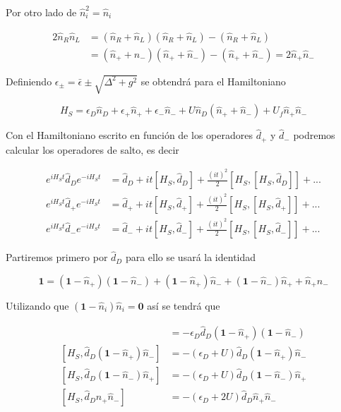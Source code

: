 \begin{appendixs}
Por otro lado de $\hat{n}^{2}_{i} = \hat{n}_{i}$

\begin{align*}
    2 \hat{n}_{R}\hat{n}_{L} & = (\hat{n}_{R} +\hat{n}_{L})(\hat{n}_{R} +\hat{n}_{L}) - (\hat{n}_{R} + \hat{n}_{L}) \\
    & = (\hat{n}_{+} +\hat{n}_{-})(\hat{n}_{+} +\hat{n}_{-}) - (\hat{n}_{+} + \hat{n}_{-})  = 2\hat{n}_{+}\hat{n}_{-}
\end{align*}

Definiendo $\epsilon_{\pm} = \bar{\epsilon} \pm \sqrt{\Delta^{2}+g^{2}}$ se obtendrá para el Hamiltoniano

\begin{equation}
    H_{S} = \epsilon_{D}\hat{n}_{D} + \epsilon_{+}\hat{n}_{+} + \epsilon_{-}\hat{n}_{-} + U\hat{n}_{D}(\hat{n}_{+} + \hat{n}_{-}) + U_{f}\hat{n}_{+}\hat{n}_{-}
    \label{apendix5:ec4}
\end{equation}

Con el Hamiltoniano escrito en función de los operadores $\hat{d}_{+}$ y $\hat{d}_{-}$ podremos calcular los operadores de salto, es decir

\begin{align*}
    e^{i H_{S}t}\hat{d}_{D}e^{-iH_{S}t} & = \hat{d}_{D} + it[H_{S},\hat{d}_{D}] + \frac{(it)^{2}}{2} [H_{S},[H_{S},\hat{d}_{D}]] +... \\
    e^{i H_{S}t}\hat{d}_{+}e^{-iH_{S}t} & = \hat{d}_{+} + it[H_{S},\hat{d}_{+}] + \frac{(it)^{2}}{2} [H_{S},[H_{S},\hat{d}_{+}]] +... \\
    e^{i H_{S}t}\hat{d}_{-}e^{-iH_{S}t} & = \hat{d}_{-} + it[H_{S},\hat{d}_{-}] + \frac{(it)^{2}}{2} [H_{S},[H_{S},\hat{d}_{-}]] +... 
\end{align*}

Partiremos primero por $\hat{d}_{D}$ para ello se usará la identidad

\begin{equation*}
    \textbf{1} = (\textbf{1} - \hat{n}_{+})(\textbf{1}-\hat{n}_{-}) + (\textbf{1} - \hat{n}_{+})\hat{n}_{-} + (\textbf{1} - \hat{n}_{-})\hat{n}_{+} + \hat{n}_{+}\hat{n}_{-} 
\end{equation*}

Utilizando que $(\textbf{1} - \hat{n}_{i})\hat{n}_{i} = \textbf{0}$ así se tendrá que

\begin{align*}
    [H_{S},\hat{d}_{D}(\textbf{1}-\hat{n}_{+})(\textbf{1} - \hat{n}_{-})] & = - \epsilon_{D}\hat{d}_{D}(\textbf{1}-\hat{n}_{+})(\textbf{1} - \hat{n}_{-}) \\
    [H_{S},\hat{d}_{D}(\textbf{1}-\hat{n}_{+})\hat{n}_{-}] & = - (\epsilon_{D} + U)\hat{d}_{D}(\textbf{1} - \hat{n}_{+})\hat{n}_{-} \\
    [H_{S},\hat{d}_{D}(\textbf{1}-\hat{n}_{-})\hat{n}_{+}] & = - (\epsilon_{D} + U)\hat{d}_{D}(\textbf{1} - \hat{n}_{-})\hat{n}_{+} \\
    [H_{S},\hat{d}_{D}\hat{n}_{+}\hat{n}_{-}] & = - (\epsilon_{D} + 2U)\hat{d}_{D}\hat{n}_{+}\hat{n}_{-} 
\end{align*}


\end{appendixs}
